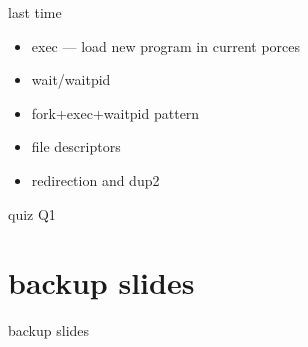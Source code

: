 \date{}
\title{}
\date{}

\begin{frame}
    \titlepage
\end{frame}



\begin{frame}{last time}
    \begin{itemize}
    \item exec --- load new program in current porces
    \item wait/waitpid
    \item fork+exec+waitpid pattern
    \item file descriptors
    \item redirection and dup2
    \end{itemize}
\end{frame}

\begin{frame}{quiz Q1}
\end{frame}



\section{backup slides}
\begin{frame}{backup slides}
\end{frame}




